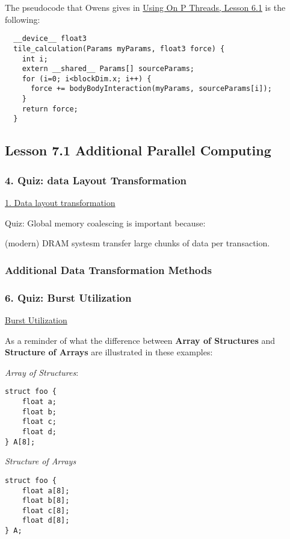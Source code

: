 \documentclass[10pt]{amsart}
\begin{document}
\begin{multicols*}{2}
The pseudocode that Owens gives in \href{https://classroom.udacity.com/courses/cs344/lessons/116611037/concepts/1168851160923}{Using On P Threads, Lesson 6.1} is the following:

\begin{lstlisting}
  __device__ float3
  tile_calculation(Params myParams, float3 force) {
    int i;
    extern __shared__ Params[] sourceParams;
    for (i=0; i<blockDim.x; i++) {
      force += bodyBodyInteraction(myParams, sourceParams[i]);
    }
    return force;
  }
  \end{lstlisting}

\subsection{Lesson 7.1 Additional Parallel Computing}
  
\subsubsection{4. Quiz: data Layout Transformation}

\href{https://classroom.udacity.com/courses/cs344/lessons/135649730/concepts/1378001110923}{1. Data layout transformation}

Quiz: Global memory coalescing is important because:

(modern) DRAM systesm transfer large chunks of data per transaction.  

\subsubsection{Additional Data Transformation Methods}

\subsubsection{6. Quiz: Burst Utilization}

\href{https://classroom.udacity.com/courses/cs344/lessons/135649730/concepts/1375149760923}{Burst Utilization}

As a reminder of what the difference between \textbf{Array of Structures} and \textbf{Structure of Arrays} are illustrated in these examples:

\emph{Array of Structures}:
\begin{lstlisting}
struct foo {
	float a;
	float b;
	float c;
	float d;
} A[8];
\end{lstlisting}

\emph{Structure of Arrays}
\begin{lstlisting}
struct foo { 
	float a[8];
	float b[8];
	float c[8];
	float d[8];
} A;
\end{lstlisting}


\end{multicols*}
\end{document}
